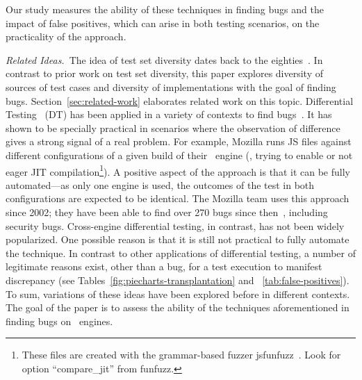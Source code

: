 \documentclass[sigconf,review, anonymous]{acmart}
\begin{document}
Our study measures the ability of these techniques in finding bugs and
the impact of false positives, which can arise in both testing
scenarios, on the practicality of the approach.


\emph{Related Ideas.}~The idea of test set diversity dates back to the
eighties~\cite{white-cohen-tse1980, ostrand-balcer-1988}. In contrast
to prior work on test set diversity, this paper explores diversity of
sources of test cases and diversity of implementations with the goal
of finding bugs. Section~\ref{sec:related-work} elaborates related
work on this topic. Differential Testing~\cite{Brumley-etal-ss07} (DT)
has been applied in a variety of contexts to find
bugs~\cite{Yang-etal-pldi11,Chen-etal-fse2015,Argyros-etla-ccs16,Chen-etal-pldi16,petsios-etal-sp2017,SivakornAPKJ17,Zhang:2017:ATD:3097368.3097448}.
It has shown to be specially practical in scenarios where the
observation of difference gives a strong signal of a real problem. For
example, Mozilla runs JS files against different configurations of
a given build of their \smonkey\ engine (\eg{}, trying to enable or
not eager JIT compilation\footnote{These files are created with
  the grammar-based fuzzer jsfunfuzz~\cite{jsfunfuzz}. Look for option
  ``compare\_jit'' from funfuzz.}). A positive aspect of the approach is that
it can be fully automated---as only one engine is used, the outcomes
of the test in both configurations are expected to be identical. The
Mozilla team uses this approach since 2002; they have been able to
find over 270 bugs since then~\cite{jsfunfuzz-at-mozilla}, including
security bugs. Cross-engine differential testing, in contrast, has not
been widely popularized. One possible reason is that it is still not
practical to fully automate the technique. In contrast to other
applications of differential testing, a number of legitimate reasons
exist, other than a bug, for a test execution to manifest discrepancy
(see Tables~\ref{fig:piecharts-transplantation} and
~\ref{tab:false-positives}). To sum, variations of these ideas have
been explored before in different contexts.  The goal of the paper is
to assess the ability of the techniques aforementioned in finding
bugs on \javascript\ engines.

\end{document}
